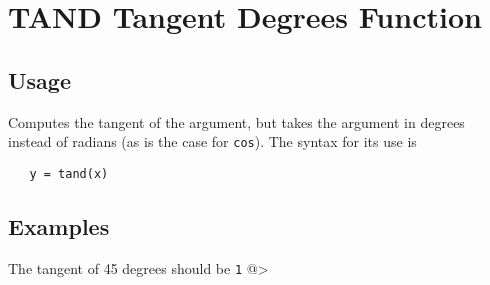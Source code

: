 \section{TAND Tangent Degrees Function}

\subsection{Usage}

Computes the tangent of the argument, but takes
the argument in degrees instead of radians (as is the case
for \verb|cos|). The syntax for its use is
\begin{verbatim}
   y = tand(x)
\end{verbatim}
\subsection{Examples}

The tangent of 45 degrees should be \verb|1|
@>
